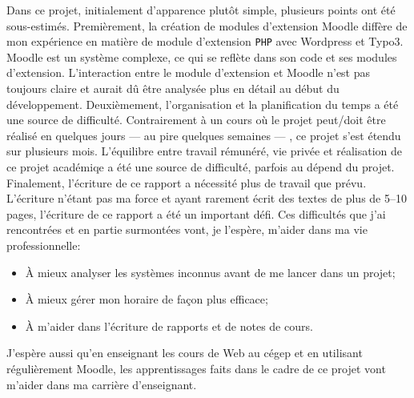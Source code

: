 \begin{conclusion}
Dans ce projet, initialement d'apparence plut\^ot simple, plusieurs points ont \'et\'e sous-estim\'es.
Premi\`erement, la cr\'eation de modules d'extension Moodle diff\`ere de mon exp\'erience en mati\`ere de module d'extension \texttt{PHP} avec Wordpress et Typo3.
Moodle est un syst\`eme complexe, ce qui se refl\`ete dans son code et ses modules d'extension.
L'interaction entre le module d'extension et Moodle n'est pas toujours claire et aurait d\^u \^etre analys\'ee plus en d\'etail au d\'ebut du d\'eveloppement.
Deuxi\`emement, l'organisation et la planification du temps a \'et\'e une source de difficult\'e.
Contrairement \`a un cours o\`u le projet peut/doit \^etre r\'ealis\'e en quelques jours --- au pire quelques semaines --- , ce projet s'est \'etendu sur plusieurs mois.
L'\'equilibre entre travail r\'emun\'er\'e,  vie priv\'ee et r\'ealisation de ce projet acad\'emiqe a \'et\'e une source de difficult\'e, parfois au d\'epend du projet.
Finalement, l'\'ecriture de ce rapport a n\'ecessit\'e plus de travail que pr\'evu.
L'\'ecriture n'\'etant pas ma force et ayant rarement \'ecrit des textes de plus de 5--10 pages, l'\'ecriture de ce rapport a \'et\'e un important d\'efi.
Ces difficult\'es que j'ai rencontr\'ees et en partie surmont\'ees vont, je l'esp\`ere, m'aider dans ma vie professionnelle:
\begin{itemize}
  \item \`A mieux analyser les syst\`emes inconnus avant de me lancer dans un projet;
  \item \`A mieux g\'erer mon horaire de fa\c{c}on plus efficace;
  \item \`A m'aider dans l'\'ecriture de rapports et de notes de cours.
\end{itemize}
J'esp\`ere aussi qu'en enseignant les cours de Web au c\'egep et en utilisant r\'eguli\`erement Moodle, les apprentissages faits dans le cadre de ce projet vont m'aider dans ma carri\`ere d'enseignant.
\end{conclusion}